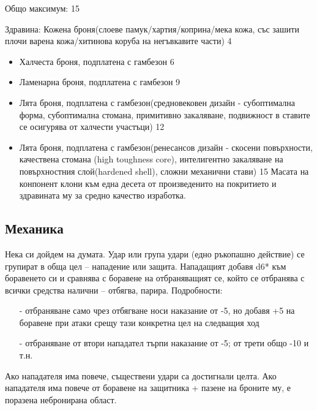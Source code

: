 Общо максимум: 15

Здравина:
Кожена броня(слоеве памук/хартия/коприна/мека кожа, със зашити плочи варена кожа/хитинова коруба на негъвкавите части) 4
\begin{itemize}
\item{Халчеста броня, подплатена с гамбезон 6}
\item{Ламенарна броня, подплатена с гамбезон 9}
\item{Лята броня, подплатена с гамбезон(средновековен дизайн - субоптимална форма, субоптимална стомана, примитивно закаляване, подвижност в ставите се осигурява от халчести участъци) 12}
\item{Лята броня, подплатена с гамбезон(ренесансов дизайн - скосени повърхности, качествена стомана (high toughness core),  интелигентно закаляване на повърхностния слой(hardened shell), сложни механични стави) 15}
Масата на конпонент клони към една десета от произведенито на покритието и здравината му за средно качество изработка.
\end{itemize}

\subsection{Механика}
Нека си дойдем на думата.
Удар или група удари (едно ръкопашно действие) се групират в обща цел – нападение или защита.
Нападащият добавя d6* към боравенето си и сравнява с боравене на отбраняващият се, който се отбранява с всички средства налични – отбягва, парира.
Подробности:
\begin{itemize}
\item[-]{отбраняване само чрез отбягване носи наказание от -5, но добавя +5 на боравене при атаки срещу тази конкретна цел на следващия ход}
\item[-]{отбраняване от втори нападател търпи наказание от -5; от трети общо -10 и т.н.}
\end{itemize}

Ако нападателя има повече, съществени удари са достигнали целта.
Ако нападателя има повече от боравене на защитника + пазене на броните му, е поразена небронирана област.

